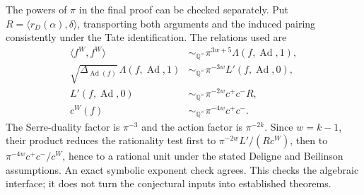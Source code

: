 \documentclass[10pt]{article}
\begin{document}
The powers of \(\pi\) in the final proof can be checked separately. Put \(R=\langle r_D(\alpha),\delta\rangle\), transporting both arguments and the induced pairing consistently under the Tate identification. The relations used are \[\begin{aligned}
 \langle f^W,f^W\rangle&\sim_{\mathbb Q^\times}\pi^{3w+5}\Lambda(f,\operatorname{Ad},1),\\
 \sqrt{\Delta_{\operatorname{Ad}(f)}}\,\Lambda(f,\operatorname{Ad},1)
     &\sim_{\mathbb Q^\times}\pi^{-3w}L'(f,\operatorname{Ad},0),\\
 L'(f,\operatorname{Ad},0)&\sim_{\mathbb Q^\times}\pi^{-2w}c^+c^-R,\\
 c^W(f)&\sim_{\mathbb Q^\times}\pi^{-4w}c^+c^-.
\end{aligned}\] The Serre-duality factor is \(\pi^{-3}\) and the action factor is \(\pi^{-2k}\). Since \(w=k-1\), their product reduces the rationality test first to \(\pi^{-2w}L'/(Rc^W)\), then to \(\pi^{-4w}c^+c^-/c^W\), hence to a rational unit under the stated Deligne and Beilinson assumptions. An exact symbolic exponent check agrees. This checks the algebraic interface; it does not turn the conjectural inputs into established theorems.\par
\end{document}
